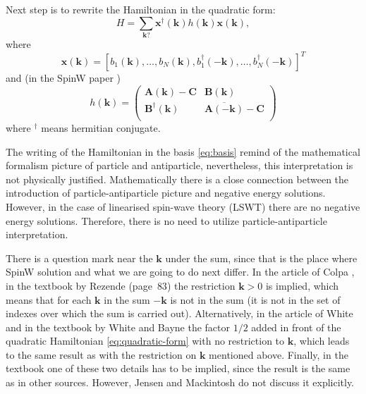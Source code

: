 \documentclass[a4paper,12pt]{article}
\begin{document}
        Next step is to rewrite the Hamiltonian in the quadratic form:
        \begin{equation}
            H = \sum_{\boldsymbol{k} ?} \boldsymbol{x}^{\dag}(\boldsymbol{k})h(\boldsymbol{k})\boldsymbol{x}(\boldsymbol{k}), \label{eq:quadratic-form}
        \end{equation}
        where
        \begin{equation}
            \boldsymbol{x}(\boldsymbol{k}) = \left[b_1(\boldsymbol{k}), \dots, b_N(\boldsymbol{k}), 
            b^{\dag}_1(-\boldsymbol{k}), \dots, b^{\dag}_N(-\boldsymbol{k})\right]^T\label{eq:basis}
        \end{equation}
        and (in the SpinW paper \cite{toth2015linear})
        \begin{equation}
            h(\boldsymbol{k}) = 
            \begin{pmatrix}
                \boldsymbol{A}(\boldsymbol{k}) - \boldsymbol{C} & \boldsymbol{B}(\boldsymbol{k}) \\
                \boldsymbol{B}^{\dag}(\boldsymbol{k}) &\overline{\boldsymbol{A}(-\boldsymbol{k})} - \boldsymbol{C} \\
            \end{pmatrix} \label{eq:h-spinw}
        \end{equation}
        where $^{\dag}$ means hermitian conjugate.

        The writing of the Hamiltonian in the basis \eqref{eq:basis} remind of the mathematical formalism picture of particle and antiparticle, 
        nevertheless, this interpretation is not physically justified.
        Mathematically there is a close connection between the introduction of particle-antiparticle picture and negative energy solutions. 
        However, in the case of linearised spin-wave theory (LSWT) there are no negative energy solutions.
        Therefore, there is no need to utilize particle-antiparticle interpretation.
        
        There is a question mark near the $\boldsymbol{k}$ under the sum, since that is the place where SpinW solution and what we are going to do next differ.
        In the article of Colpa \cite{colpa1978diagonalization}, in the textbook by Rezende \cite{rezende2020fundamentals} (page~$83$) 
        the restriction $\boldsymbol{k} > 0$ is implied, 
        which means that for each $\boldsymbol{k}$ in the sum $-\boldsymbol{k}$ is not in the sum (it is not in the set of indexes over which the sum is carried out). 
        Alternatively, in the article of White \cite{white1965diagonalization} and in the textbook by White and Bayne \cite{white1983quantum} 
        the factor $1/2$ added in front of the quadratic Hamiltonian \eqref{eq:quadratic-form} with no restriction to $\boldsymbol{k}$, 
        which leads to the same result as with the restriction on $\boldsymbol{k}$ mentioned above. 
        Finally, in the textbook \cite{jensen1991rare} one of these two details has to be implied, 
        since the result is the same as in other sources. However, Jensen and Mackintosh do not discuss it explicitly.
\end{document}
